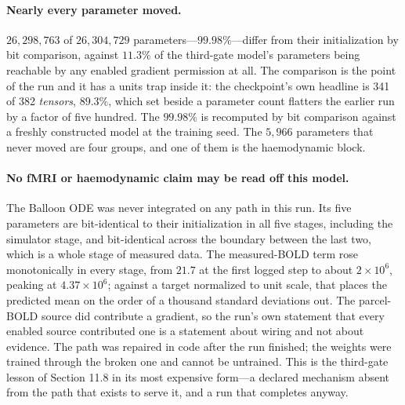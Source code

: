 \paragraph{Nearly every parameter moved.}
\(26{,}298{,}763\) of \(26{,}304{,}729\) parameters---\(99.98\%\)---differ from
their initialization by bit comparison, against \(11.3\%\) of the third-gate
model's parameters being reachable by any enabled gradient permission at all.
The comparison is the point of the run and it has a units trap inside it: the
checkpoint's own headline is 341 of 382 \emph{tensors}, \(89.3\%\), which set
beside a parameter count flatters the earlier run by a factor of five hundred.
The \(99.98\%\) is recomputed by bit comparison against a freshly constructed
model at the training seed. The \(5{,}966\) parameters that never moved are four
groups, and one of them is the haemodynamic block.

\paragraph{No fMRI or haemodynamic claim may be read off this model.}
The Balloon ODE was never integrated on any path in this run. Its five
parameters are bit-identical to their initialization in all five stages,
including the simulator stage, and bit-identical across the boundary between the
last two, which is a whole stage of measured data. The measured-BOLD term rose
monotonically in every stage, from \(21.7\) at the first logged step to about
\(2\times10^{6}\), peaking at \(4.37\times10^{6}\); against a target normalized
to unit scale, that places the predicted mean on the order of a thousand standard
deviations out. The parcel-BOLD source did contribute a gradient, so the run's
own statement that every enabled source contributed one is a statement about
wiring and not about evidence. The path was repaired in code after the run
finished; the weights were trained through the broken one and cannot be
untrained. This is the third-gate lesson of Section 11.8 in its most expensive
form---a declared mechanism absent from the path that exists to serve it, and a
run that completes anyway.

